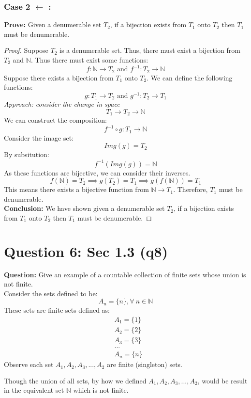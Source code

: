\documentclass[11pt]{article}
\theoremstyle{plain}
\begin{document}
\subsubsection*{Case 2 $\leftarrow$ :}
\textbf{Prove:} Given a denumerable set $T_2$, if a bijection exists from $T_1$ onto $T_2$ then $T_1$ must be denumerable.
\begin{proof}
	Suppose $T_2$ is a denumerable set. Thus, there must exist a bijection from $T_2$ and $\mathbb{N}$. Thus there must exist some functions:
	\[
		f: \mathbb{N} \rightarrow T_2 \text{ and } f^{-1}: T_2 \rightarrow \mathbb{N}
	\]
	Suppose there exists a bijection from $T_1$ onto $T_2$. We can define the following functions:
	\[
		g: T_1 \rightarrow T_2 \text{ and } g^{-1}: T_2 \rightarrow T_1
	\]
	\textit{Approach: consider the change in space}
	\[
		T_1 \rightarrow T_2 \rightarrow \mathbb{N}
	\]
	We can construct the composition:
	\[
		f^{-1} \circ g: T_1 \rightarrow \mathbb{N}
	\]
	Consider the image set:
	\[
		Img(g) = T_2
	\]
	By subsitution:
	\[
		f^{-1}(Img(g)) = \mathbb{N}
	\]
	As these functions are bijective, we can consider their inverses.
	\[
		f(\mathbb{N}) = T_2 \implies g(T_2) = T_1 \implies g(f(\mathbb{N})) = T_1
	\]
	This means there exists a bijective function from $\mathbb{N} \rightarrow T_1$. Therefore, $T_1$ must be denumerable.\\
	\textbf{Conclusion:} We have shown given a denumerable set $T_2$, if a bijection exists from $T_1$ onto $T_2$ then $T_1$ must be denumerable.
\end{proof}
\section*{Question 6: Sec 1.3 (q8)}
\textbf{Question:} Give an example of a countable collection of finite sets whose union is not finite. \\
Consider the sets defined to be:
\[
	A_n = \{ n \}, \forall ~n \in \mathbb{N}
\]
These sets are finite sets defined as:
\begin{align*}
	 & A_1 = \{ 1 \} \\
	 & A_2 = \{ 2 \} \\
	 & A_3 = \{ 3 \} \\
	 & ...           \\
	 & A_n = \{ n \}
\end{align*}
Observe each set $A_1, A_2, A_3, ..., A_2$ are finite (singleton) sets. \\
\begin{center}
	Though the union of all sets, by how we defined $A_1, A_2, A_3, ..., A_2$, would be result in the equivalent set $\mathbb{N}$ which is not finite.
\end{center}
\end{document}
